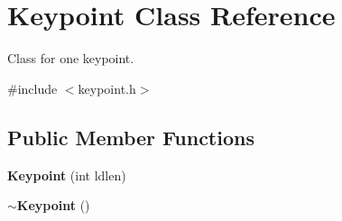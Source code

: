 \section{Keypoint Class Reference}
\label{classKeypoint}


Class for one keypoint.  




{\ttfamily \#include $<$keypoint.\+h$>$}

\subsection*{Public Member Functions}
\begin{DoxyCompactItemize}
\item 
{\bf Keypoint} (int ldlen)
\item 
{\bf $\sim$\+Keypoint} ()
\end{DoxyCompactItemize}
